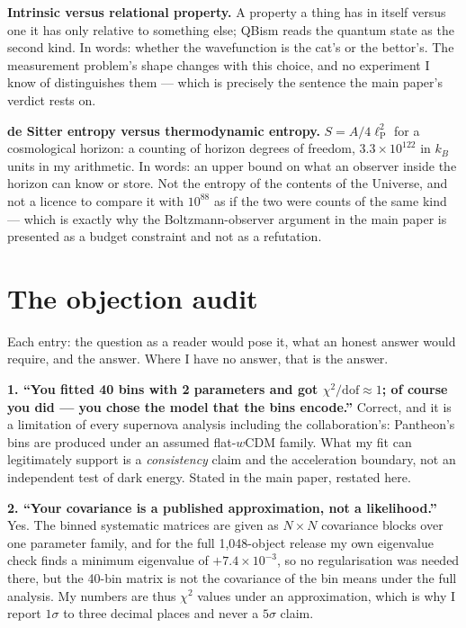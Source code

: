 \documentclass[11pt]{article}
\begin{document}
\textbf{Intrinsic versus relational property.} A property a thing has in itself versus one it has
only relative to something else; QBism reads the quantum state as the second kind. In words: whether
the wavefunction is the cat's or the bettor's. The measurement problem's shape changes with this
choice, and no experiment I know of distinguishes them --- which is precisely the sentence the
main paper's verdict rests on.

\textbf{de Sitter entropy versus thermodynamic entropy.} $S = A/4\ell_{\text{P}}^2$ for a cosmological
horizon: a counting of horizon degrees of freedom, $3.3\times10^{122}$ in $k_B$ units in my
arithmetic. In words: an upper bound on what an observer inside the horizon can know or store. Not the
entropy of the contents of the Universe, and not a licence to compare it with $10^{88}$ as if the two
were counts of the same kind --- which is exactly why the Boltzmann-observer argument in the main paper
is presented as a budget constraint and not as a refutation.

\section{The objection audit}

Each entry: the question as a reader would pose it, what an honest answer would require, and the
answer. Where I have no answer, that is the answer.

\textbf{1. ``You fitted 40 bins with 2 parameters and got $\chi^2/{\text{dof}}\approx1$; of course you did --- you chose the model that the bins encode.''} Correct, and it is a limitation of every
supernova analysis including the collaboration's: Pantheon's bins are produced under an assumed
flat-$w$CDM family. What my fit can legitimately support is a \emph{consistency} claim and the
acceleration boundary, not an independent test of dark energy. Stated in the main paper, restated here.

\textbf{2. ``Your covariance is a published approximation, not a likelihood.''} Yes. The binned
systematic matrices are given as $N\times N$ covariance blocks over one parameter family, and for the
full 1,048-object release my own eigenvalue check finds a minimum eigenvalue of $+7.4\times10^{-3}$,
so no regularisation was needed there, but the 40-bin matrix is not the covariance of the bin means
under the full analysis. My numbers are thus $\chi^2$ values under an approximation, which is why I
report $1\sigma$ to three decimal places and never a $5\sigma$ claim.
\end{document}
